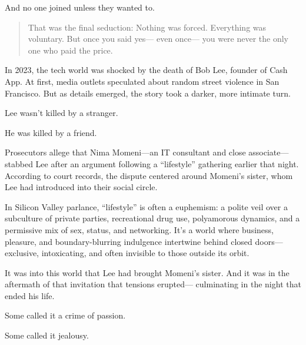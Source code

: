 And no one joined unless they wanted to.

\begin{quote}
That was the final seduction:  
Nothing was forced.  
Everything was voluntary.  
But once you said yes—  
even once—  
you were never the only one who paid the price.
\end{quote}


\begin{tcolorbox}[colback=gray!5!white, colframe=gray!50!black, breakable, title={Historical Sidebar: Bob Lee, the Lifestyle, and the Price of Admission}]

  In 2023, the tech world was shocked by the death of Bob Lee, founder of Cash App.  
  At first, media outlets speculated about random street violence in San Francisco.  
  But as details emerged, the story took a darker, more intimate turn.
  
  \medskip
  
  Lee wasn’t killed by a stranger.
  
  \medskip
  
  He was killed by a friend.
  
  \medskip
  
  Prosecutors allege that Nima Momeni—an IT consultant and close associate—stabbed Lee after an argument following a “lifestyle” gathering earlier that night. According to court records, the dispute centered around Momeni’s sister, whom Lee had introduced into their social circle.
  
  \medskip
  
  In Silicon Valley parlance, “lifestyle” is often a euphemism: a polite veil over a subculture of private parties, recreational drug use, polyamorous dynamics, and a permissive mix of sex, status, and networking. It’s a world where business, pleasure, and boundary-blurring indulgence intertwine behind closed doors—exclusive, intoxicating, and often invisible to those outside its orbit.
  
  \medskip
  
  It was into this world that Lee had brought Momeni’s sister. And it was in the aftermath of that invitation that tensions erupted—  
  culminating in the night that ended his life.

  \medskip
  
  Some called it a crime of passion.

  \medskip
  
  Some called it jealousy.
  
  \medskip
  

\end{tcolorbox}
